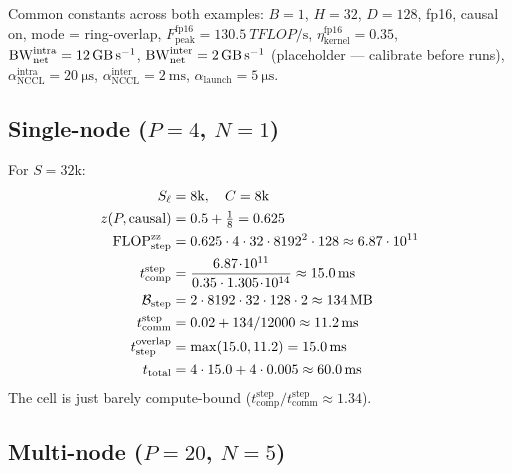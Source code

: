 \documentclass[11pt]{article}
\newcommand{\flops}{\mathrm{FLOP}}
\newcommand{\bw}{\mathrm{BW}}
\newcommand{\peak}{\mathrm{peak}}
\newcommand{\comp}{\mathrm{comp}}
\newcommand{\comm}{\mathrm{comm}}
\newcommand{\tot}{\mathrm{total}}
\newcommand{\step}{\mathrm{step}}
\newcommand{\zz}{\mathrm{zz}}
\begin{document}
Common constants across both examples:
$B=1$, $H=32$, $D=128$, fp16, causal on, mode = ring-overlap,
$F_\peak^{\text{fp16}} = \SI{130.5}{TFLOP\per\second}$,
$\eta_{\text{kernel}}^{\text{fp16}} = 0.35$,
$\bw_{\text{net}}^{\text{intra}} = \SI{12}{\giga\byte\per\second}$,
$\bw_{\text{net}}^{\text{inter}} = \SI{2}{\giga\byte\per\second}$
(placeholder --- calibrate before runs),
$\alpha_{\text{NCCL}}^{\text{intra}} = \SI{20}{\micro\second}$,
$\alpha_{\text{NCCL}}^{\text{inter}} = \SI{2}{\milli\second}$,
$\alpha_{\text{launch}} = \SI{5}{\micro\second}$.

\subsection{Single-node ($P = 4$, $N = 1$)}

For $S = 32$k:
\begin{align}
  S_\ell &= 8\text{k},\quad C = 8\text{k} \\
  z(P,\text{causal}) &= 0.5 + \tfrac{1}{8} = 0.625 \\
  \flops_\step^\zz   &= 0.625 \cdot 4 \cdot 32 \cdot 8192^2 \cdot 128
                       \approx 6.87 \cdot 10^{11} \\
  t_\comp^\step      &= \frac{6.87\!\cdot\!10^{11}}
                              {0.35 \cdot 1.305\!\cdot\!10^{14}}
                       \approx \SI{15.0}{\milli\second} \\
  \mathcal{B}_\step  &= 2 \cdot 8192 \cdot 32 \cdot 128 \cdot 2
                       \approx \SI{134}{\mega\byte} \\
  t_\comm^\step      &= 0.02 + 134/12000
                       \approx \SI{11.2}{\milli\second} \\
  t_\step^{\text{overlap}} &= \max(15.0, 11.2) = \SI{15.0}{\milli\second} \\
  t_\tot             &= 4 \cdot 15.0 + 4 \cdot 0.005
                       \approx \SI{60.0}{\milli\second}
\end{align}
The cell is just barely compute-bound
($t_\comp^\step / t_\comm^\step \approx 1.34$).

\subsection{Multi-node ($P = 20$, $N = 5$)}
\end{document}
